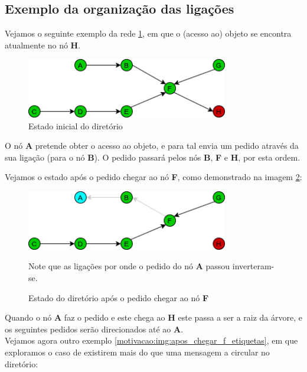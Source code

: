 \subsection*{Exemplo da organização das ligações}

Vejamos o seguinte exemplo da rede \ref{motivacao:img:estado_inicial}, em que o (acesso ao) objeto se encontra atualmente no nó \textbf{H}.


\begin{figure}[!htb]
\centering
\includegraphics[width=250pt]{um_pedido_1.png}
\caption{Estado inicial do diretório}
\label{motivacao:img:estado_inicial}
\end{figure}

O nó \textbf{A} pretende obter o acesso ao objeto, e para tal envia um pedido através da sua ligação (para o nó \textbf{B}).
O pedido passará pelos nós \textbf{B}, \textbf{F} e \textbf{H}, por esta ordem.

Vejamos o estado após o pedido chegar ao nó \textbf{F}, como demonstrado na imagem \ref{motivacao:img:apos_chegar_f}:

\begin{figure}[!htb]
\centering
\includegraphics[width=250pt]{um_pedido_2.png}
\caption{Estado do diretório após o pedido chegar ao nó \textbf{F}}
Note que as ligações por onde o pedido do nó \textbf{A} passou inverteram-se.
\label{motivacao:img:apos_chegar_f}
\end{figure}


Quando o nó \textbf{A} faz o pedido e este chega ao \textbf{H} este passa a ser a raiz da árvore, e os seguintes pedidos serão direcionados até ao \textbf{A}.\\



Vejamos agora outro exemplo \ref{motivacao:img:apos_chegar_f_etiquetas}, em que exploramos o caso de existirem mais do que uma mensagem a circular no diretório:

